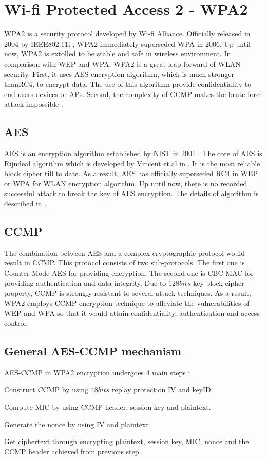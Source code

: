 \section{Wi-fi Protected Access 2 - WPA2}

\ac{WPA}2 is a security protocol developed by Wi-fi Alliance. Officially released in 2004 by \ac{IEEE}802.11i \cite{4248378}, \ac{WPA}2 immediately superseded \ac{WPA} in 2006. Up until now, \ac{WPA}2 is extolled to be stable and safe in wireless environment. In comparison with \ac{WEP} and \ac{WPA}, \ac{WPA}2 is a great leap forward of \ac{WLAN} security. First, it uses \ac{AES} encryption algorithm, which is much stronger than\ac{RC4}, to encrypt data. The use of this algorithm provide confidentiality to end users devices or \ac{AP}s. Second, the complexity of \ac{CCMP} makes the brute force attack impossible \cite{alblwi2017survey}.
\subsection{AES}
\ac{AES} is an encryption algorithm established by \ac{NIST} in 2001 \cite{standard2001announcing}. The core of \ac{AES} is Rijndeal algorithm which is developed by Vincent et.al in \cite{daemen1999aes}. It is the most reliable block cipher till to date. As a result, \ac{AES} has officially superseded \ac{RC4} in \ac{WEP} or \ac{WPA} for \ac{WLAN} encryption algorithm. Up until now, there is no recorded successful attack to break the key of \ac{AES} encryption. The details of algorithm is described in \cite{daemen1999aes}.
\subsection{CCMP}
The combination between \ac{AES} and a complex cryptographic protocol would result in \ac{CCMP}. This protocol consists of two sub-protocols. The first one is Counter Mode \ac{AES} for providing encryption. The second one is \ac{CBC-MAC} for providing authentication and data integrity. Due to $128bits$ key block cipher property, \ac{CCMP} is strongly resistant to several attack techniques. As a result, \ac{WPA}2 employs \ac{CCMP} encryption technique to alleviate the vulnerabilities of \ac{WEP} and \ac{WPA} so that it would attain confidentiality, authentication and access control.
\subsection{General AES-CCMP mechanism}
\ac{AES}-\ac{CCMP} in \ac{WPA}2 encryption undergoes 4 main steps \cite{kolokithas2015hacking}:
\begin{steps}
	\item Construct \ac{CCMP} by using $48bits$ replay protection \ac{IV} and keyID.
	\item Compute \ac{MIC} by using \ac{CCMP} header, session key and plaintext.
	\item Generate the nonce by using \ac{IV} and plaintext
	\item Get ciphertext through encrypting plaintext, session key, \ac{MIC}, nonce and the CCMP header achieved from previous step.
\end{steps}

